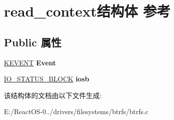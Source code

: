 \hypertarget{structread__context}{}\section{read\+\_\+context结构体 参考}
\label{structread__context}
\subsection*{Public 属性}
\begin{DoxyCompactItemize}
\item 
\mbox{\label{structread__context_ace221aa09a0921f898a4dcbab84a87be}} 
\hyperlink{struct___k_e_v_e_n_t}{K\+E\+V\+E\+NT} {\bfseries Event}
\item 
\mbox{\label{structread__context_a5147a17f3020e5e6a741ba3b346cc759}} 
\hyperlink{struct___i_o___s_t_a_t_u_s___b_l_o_c_k}{I\+O\+\_\+\+S\+T\+A\+T\+U\+S\+\_\+\+B\+L\+O\+CK} {\bfseries iosb}
\end{DoxyCompactItemize}


该结构体的文档由以下文件生成\+:\begin{DoxyCompactItemize}
\item 
E\+:/\+React\+O\+S-\/0../drivers/filesystems/btrfs/btrfs.\+c\end{DoxyCompactItemize}
